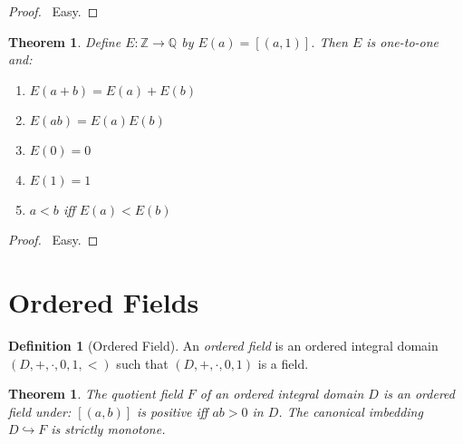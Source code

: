 \documentclass{article}
\let\qed\relax
\newtheorem{theorem}[axiom]{Theorem}
\theoremstyle{definition}
\newtheorem{definition}[axiom]{Definition}
\begin{document}
    \begin{proof}
        \pf\ Easy. \qed
    \end{proof}

    \begin{theorem}
        Define $E : \mathbb{Z} \rightarrow \mathbb{Q}$ by $E(a) = [(a,1)]$. Then $E$ is one-to-one and:
        \begin{enumerate}
            \item $E(a+b) = E(a) + E(b)$
            \item $E(ab) = E(a)E(b)$
            \item $E(0) = 0$
            \item $E(1) = 1$
            \item $a < b$ iff $E(a) < E(b)$
        \end{enumerate}
    \end{theorem}

    \begin{proof}
        \pf\ Easy. \qed
    \end{proof}

    \section{Ordered Fields}

    \begin{definition}[Ordered Field]
        An \emph{ordered field} is an ordered integral domain $(D, +, \cdot, 0, 1, <)$ such that $(D, +, \cdot, 0, 1)$
        is a field.
    \end{definition}

    \begin{theorem}
        The quotient field $F$ of an ordered integral domain $D$ is an ordered field under: $[(a,b)]$ is positive iff $ab > 0$ in $D$.
        The canonical imbedding $D \hookrightarrow F$ is strictly monotone.
    \end{theorem}
\end{document}
